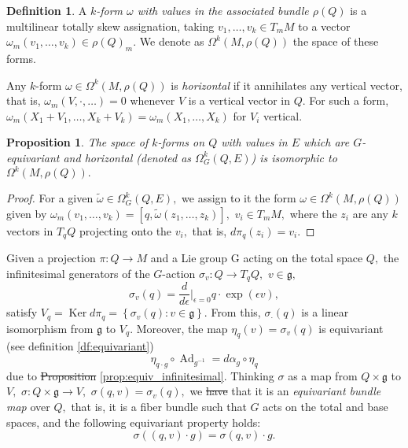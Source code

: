 \documentclass[12pt, letterpaper, reqno]{amsart}
\theoremstyle{definition}
\newtheorem{df}{Definition}
\theoremstyle{plain}
\newtheorem{prop}{Proposition}
\theoremstyle{remark}
\providecommand{\DIFadd}[1]{{\protect\color{blue}\uwave{#1}}} %
\providecommand{\DIFdel}[1]{{\protect\color{red}\sout{#1}}}                      %
\providecommand{\DIFaddbegin}{} %
\providecommand{\DIFaddend}{} %
\providecommand{\DIFdelbegin}{} %
\providecommand{\DIFdelend}{} %
\newcommand{\DIFscaledelfig}{0.5}
\newlength{\DIFdelgraphicswidth} %
\newlength{\DIFdelgraphicsheight} %
\newcommand{\DIFaddincludegraphics}[2][]{{\color{blue}\fbox{\DIFOincludegraphics[#1]{#2}}}} %
\newcommand{\DIFdelincludegraphics}[2][]{%
\sbox{\DIFdelgraphicsbox}{\DIFOincludegraphics[#1]{#2}}%
\settoboxwidth{\DIFdelgraphicswidth}{\DIFdelgraphicsbox} %
\settoboxtotalheight{\DIFdelgraphicsheight}{\DIFdelgraphicsbox} %
\scalebox{\DIFscaledelfig}{%
\parbox[b]{\DIFdelgraphicswidth}{\usebox{\DIFdelgraphicsbox}\\[-\baselineskip] \rule{\DIFdelgraphicswidth}{0em}}\llap{\resizebox{\DIFdelgraphicswidth}{\DIFdelgraphicsheight}{%
\setlength{\unitlength}{\DIFdelgraphicswidth}%
\begin{picture}(1,1)%
\thicklines\linethickness{2pt} %
{\color[rgb]{1,0,0}\put(0,0){\framebox(1,1){}}}%
{\color[rgb]{1,0,0}\put(0,0){\line( 1,1){1}}}%
{\color[rgb]{1,0,0}\put(0,1){\line(1,-1){1}}}%
\end{picture}%
}\hspace*{3pt}}} %
} %
\DeclareRobustCommand{\DIFaddbegin}{\DIFOaddbegin \let\includegraphics\DIFaddincludegraphics} %
\DeclareRobustCommand{\DIFaddend}{\DIFOaddend \let\includegraphics\DIFOincludegraphics} %
\DeclareRobustCommand{\DIFdelbegin}{\DIFOdelbegin \let\includegraphics\DIFdelincludegraphics} %
\DeclareRobustCommand{\DIFdelend}{\DIFOaddend \let\includegraphics\DIFOincludegraphics} %
\begin{document}
\begin{df}
	A \textit{$ k $-form $ \omega $ with values in the associated bundle $ \rho(Q) $} is a multilinear totally skew assignation, taking $ v_1,\dots, v_k\in T_mM $ to a vector $ \omega_m(v_1,\dots,v_k)\in \rho(Q)_m. $  We denote as $ \Omega^k(M, \rho(Q)) $ the space of these forms.
\end{df}

Any $ k $-form $ \omega\in \Omega^k(M,\rho(Q)) $ is \textit{horizontal} if it annihilates any vertical vector, that is, $ \omega_m(V,\cdot,\dots)=0 $ whenever $ V $ is a vertical vector in $ Q. $ For such a form, $ \omega_m(X_1+V_1,\dots,X_k+V_k)=\omega_m(X_1,\dots, X_k) $ for $ V_i $ vertical.

\begin{prop}
	The space of $ k $-forms on $ Q $ with values in $ E $ which are $ G $-equivariant and horizontal (denoted as $ \Omega^k_G(Q,E) $) is isomorphic to $ \Omega^k(M,\rho(Q)). $ 
\end{prop}
\begin{proof}
	For a given $ \tilde \omega\in\Omega^k_G(Q,E), $ we assign to it the form $ \omega\in\Omega^k(M, \rho(Q)) $ given by $ \omega_m(v_1,\dots,v_k) = [q,\tilde\omega(z_1,\dots,z_k)],  $  $v_i\in T_mM, $ where the $ z_i $ are any $ k $ vectors in $ T_qQ $ projecting onto the $ v_i, $ that is, $ d\pi_q(z_i)=v_i. $  
\end{proof}

Given a projection $ \pi: Q \rightarrow M $ and a Lie group G acting on the total space $ Q, $ the infinitesimal generators of the $ G $-action $ \sigma_v: Q \rightarrow T_qQ, $ $ v\in \mathfrak{g,} $ 
$$ \sigma_v(q) = \frac{d}{d\epsilon} \Big|_{\epsilon=0} q\cdot \operatorname{exp} (\epsilon v),$$
satisfy $ V_q = \operatorname{Ker}d\pi_q = \left\{ \sigma_v(q): v\in \mathfrak{g} \right\} .  $ From this, $ \sigma_\cdot(q) $ is a linear isomorphism from $ \mathfrak{g} $ to $ V_q. $ Moreover, the map $ \eta_q(v)  = \sigma_v(q) $ is equivariant (see definition \ref{df:equivariant})
$$ \eta_{q\cdot g}\circ \operatorname{Ad}_{g^{-1}} = d\alpha_g  \circ \eta_q $$ 
due to \DIFdelbegin \DIFdel{Proposition }\DIFdelend \DIFaddbegin \DIFadd{proposition }\DIFaddend \ref{prop:equiv_infinitesimal}. Thinking $ \sigma $ as a map from $ Q\times \mathfrak{g} $ to $ V, $ $ \sigma:Q\times \mathfrak{g}\rightarrow V, $ $ \sigma(q,v)= \sigma_v(q), $ we \DIFdelbegin \DIFdel{have }\DIFdelend \DIFaddbegin \DIFadd{deduce }\DIFaddend that it is an \textit{equivariant bundle map} over $ Q, $ that is, it is a fiber bundle such that $ G $ acts on the total and base spaces, and the following equivariant property holds:
$$ \sigma \left( (q,v)\cdot g \right) = \sigma(q,v) \cdot g. $$ 
\end{document}
